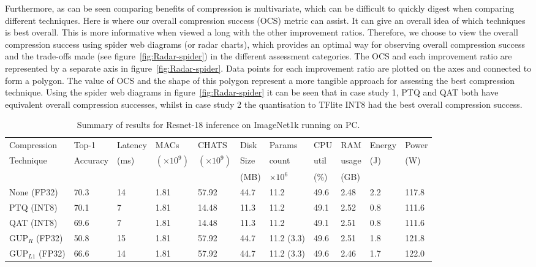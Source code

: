 Furthermore, as can be seen comparing benefits of compression is multivariate, which can be difficult to quickly digest when comparing different techniques. Here is where our overall compression success (OCS) metric can assist. It can give an overall idea of which techniques is best overall. This is more informative when viewed a long with the other improvement ratios. 
%
Therefore, we choose to view the overall compression success using spider web diagrams (or radar charts), which provides an optimal way for observing overall compression success and the trade-offs made (see figure~\ref{fig:Radar-spider}) in the different assessment categories. 
%
The OCS and each improvement ratio are represented by a separate axis in figure~\ref{fig:Radar-spider}. Data
points for each improvement ratio are plotted on the axes and connected to form a polygon. 
%
The value of OCS and the shape of this polygon represent a more tangible approach for assessing the best compression technique. 
%
Using the spider web diagrams in figure~\ref{fig:Radar-spider} it can be seen that in case study 1, PTQ and QAT both have equivalent overall compression successes, whilst in case study 2 the quantisation to TFlite INT8  had the best overall compression success. 


\begin{table}[]
    \centering
    \begin{tabular}{| l || l | l | l | l | l | l | l | l | l |l|} 
        \hline
        Compression & Top-1 & Latency & MACs & CHATS & Disk & Params & CPU & RAM & Energy & Power \\
        Technique & Accuracy & (ms) &  $(\times 10^9)$ & $(\times 10^9)$ & Size & count & util & usage &(J) & (W) \\
         &  & & & & (MB) & $\times 10^6$& (\%) & (GB) & & \\
        \hline        
        None (FP32)      & 70.3 & 14 & 1.81 & 57.92 & 44.7 & 11.2 & 49.6 & 2.48 & 2.2 & 117.8\\
        PTQ (INT8)       & 70.1 & 7 & 1.81 & 14.48 & 11.3 & 11.2 & 49.1 & 2.52 & 0.8 & 111.6\\
        QAT (INT8)       & 69.6  & 7 & 1.81 & 14.48 & 11.3 & 11.2 & 49.1 & 2.51 & 0.8 & 111.6 \\
        GUP$_R$ (FP32)   & 50.8 & 15 & 1.81 & 57.92 & 44.7 & 11.2 (3.3) & 49.6& 2.51 & 1.8 & 121.8 \\
        GUP$_{L1}$ (FP32)& 66.6 & 14 & 1.81 & 57.92 & 44.7 & 11.2 (3.3) & 49.6 & 2.46 & 1.7 &122.0\\
        \hline
    \end{tabular}
    \caption{Summary of results for Resnet-18 inference on ImageNet1k running on PC.}%
    \label{tab:resnet-imagnet1k}
\end{table}

